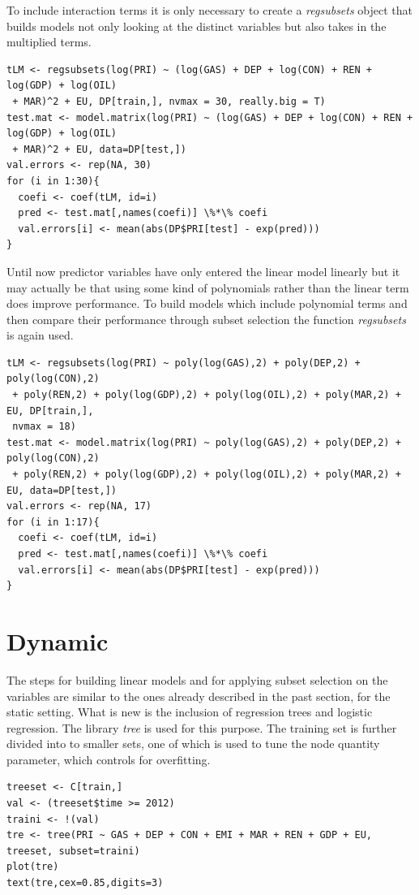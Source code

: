 \documentclass{book}
\begin{document}
To include interaction terms it is only necessary to create a \textit{regsubsets} object that builds models not only looking at the distinct variables but also takes in the multiplied terms.

\begin{verbatim}
tLM <- regsubsets(log(PRI) ~ (log(GAS) + DEP + log(CON) + REN + log(GDP) + log(OIL)
 + MAR)^2 + EU, DP[train,], nvmax = 30, really.big = T)
test.mat <- model.matrix(log(PRI) ~ (log(GAS) + DEP + log(CON) + REN + log(GDP) + log(OIL)
 + MAR)^2 + EU, data=DP[test,])
val.errors <- rep(NA, 30)
for (i in 1:30){
  coefi <- coef(tLM, id=i)
  pred <- test.mat[,names(coefi)] \%*\% coefi
  val.errors[i] <- mean(abs(DP$PRI[test] - exp(pred)))
}
\end{verbatim}

Until now predictor variables have only entered the linear model linearly but it may actually be that using some kind of polynomials rather than the linear term does improve performance. To build models which include polynomial terms and then compare their performance through subset selection the function \textit{regsubsets} is again used.

\begin{verbatim}
tLM <- regsubsets(log(PRI) ~ poly(log(GAS),2) + poly(DEP,2) + poly(log(CON),2)
 + poly(REN,2) + poly(log(GDP),2) + poly(log(OIL),2) + poly(MAR,2) + EU, DP[train,],
 nvmax = 18)
test.mat <- model.matrix(log(PRI) ~ poly(log(GAS),2) + poly(DEP,2) + poly(log(CON),2)
 + poly(REN,2) + poly(log(GDP),2) + poly(log(OIL),2) + poly(MAR,2) + EU, data=DP[test,])
val.errors <- rep(NA, 17)
for (i in 1:17){
  coefi <- coef(tLM, id=i)
  pred <- test.mat[,names(coefi)] \%*\% coefi
  val.errors[i] <- mean(abs(DP$PRI[test] - exp(pred)))
}
\end{verbatim}

\section*{Dynamic}

The steps for building linear models and for applying subset selection on the variables are similar to the ones already described in the past section, for the static setting. What is new is the inclusion of regression trees and logistic regression. The library \textit{tree} is used for this purpose. The training set is further divided into to smaller sets, one of which is used to tune the node quantity parameter, which controls for overfitting.

\begin{verbatim}
treeset <- C[train,]
val <- (treeset$time >= 2012)
traini <- !(val)
tre <- tree(PRI ~ GAS + DEP + CON + EMI + MAR + REN + GDP + EU, treeset, subset=traini)
plot(tre)
text(tre,cex=0.85,digits=3)
\end{verbatim}
\end{document}
